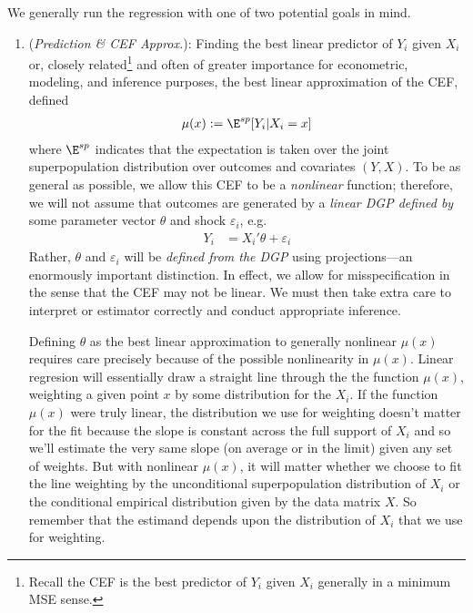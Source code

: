 \documentclass[12pt]{article}
\theoremstyle{plain}
\theoremstyle{definition}
\theoremstyle{remark}
\begin{document}
We generally run the regression with one of two potential goals in mind.
\begin{enumerate}
  \item
    (\emph{Prediction \& CEF Approx.}):
    Finding the best linear predictor of $Y_i$ given $X_i$ or, closely
    related\footnote{%
      Recall the CEF is the best predictor of $Y_i$ given $X_i$
      generally in a minimum MSE sense.
    }
    and often of greater importance for econometric, modeling, and
    inference purposes, the best linear approximation of the CEF,
    defined
    \begin{align*}
      \mu(x):=\E^{sp}[Y_i|X_i=x]
    \end{align*}
    where $\E^{sp}$ indicates that the expectation is taken over the
    joint superpopulation distribution over outcomes and covariates
    $(Y,X)$.
    To be as general as possible, we allow this CEF to be a
    \emph{nonlinear} function;
    therefore, we will not assume that outcomes are generated by a
    \emph{linear DGP defined by} some parameter vector $\theta$
    and shock $\varepsilon_i$, e.g.
    \begin{align}
      Y_i
      &=
      X_i'\theta
      +
      \varepsilon_i
      \label{regeq}
    \end{align}
    Rather, $\theta$ and $\varepsilon_i$ will be
    \emph{defined from the DGP} using projections---an enormously
    important distinction.
    In effect, we allow for misspecification in the sense that the CEF
    may not be linear. We must then take extra care to interpret or
    estimator correctly and conduct appropriate inference.

    Defining $\theta$ as the best linear approximation to generally
    nonlinear $\mu(x)$ requires care precisely because of the possible
    nonlinearity in $\mu(x)$.
    Linear regresion will essentially draw a straight line through the
    the function $\mu(x)$, weighting a given point $x$ by some
    distribution for the $X_i$.
    If the function $\mu(x)$ were truly linear, the distribution we use
    for weighting doesn't matter for the fit because the slope is
    constant across the full support of $X_i$ and so we'll estimate the
    very same slope (on average or in the limit) given any set of
    weights.
    But with nonlinear $\mu(x)$, it will matter whether we choose to fit
    the line weighting by the unconditional superpopulation distribution
    of $X_i$ or the conditional empirical distribution given by the
    data matrix $X$.
    So remember that the estimand depends upon the distribution of $X_i$
    that we use for weighting.


\end{enumerate}
\end{document}
